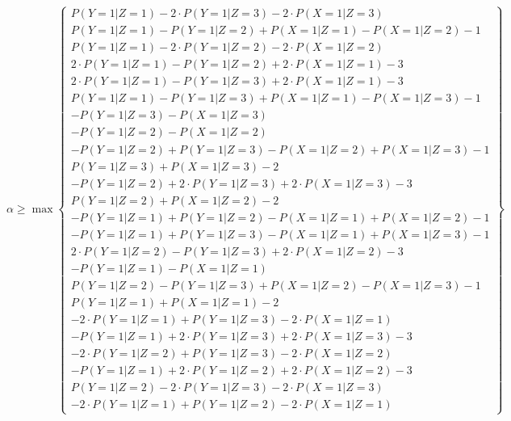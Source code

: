 \documentclass[
]{article}
\theoremstyle{plain}
\begin{document}
\[
\alpha \ge \max
\begin{Bmatrix}
P(Y = 1 | Z = 1)-2\cdot P(Y = 1 | Z = 3)-2\cdot P(X = 1 | Z = 3) \\ 
P(Y = 1 | Z = 1)-P(Y = 1 | Z = 2) +  P(X = 1 | Z = 1)-P(X = 1 | Z = 2) -1 \\ 
P(Y = 1 | Z = 1)-2\cdot P(Y = 1 | Z = 2)-2\cdot P(X = 1 | Z = 2) \\ 
2\cdot P(Y = 1 | Z = 1)-P(Y = 1 | Z = 2) +  2\cdot P(X = 1 | Z = 1) -3 \\ 
2\cdot P(Y = 1 | Z = 1)-P(Y = 1 | Z = 3) +  2\cdot P(X = 1 | Z = 1) -3 \\ 
P(Y = 1 | Z = 1)-P(Y = 1 | Z = 3) +  P(X = 1 | Z = 1)-P(X = 1 | Z = 3) -1 \\ 
-P(Y = 1 | Z = 3)-P(X = 1 | Z = 3) \\ 
-P(Y = 1 | Z = 2)-P(X = 1 | Z = 2) \\ 
-P(Y = 1 | Z = 2) +  P(Y = 1 | Z = 3)-P(X = 1 | Z = 2) +  P(X = 1 | Z = 3) -1 \\ 
 P(Y = 1 | Z = 3) +  P(X = 1 | Z = 3) -2 \\ 
-P(Y = 1 | Z = 2) +  2\cdot P(Y = 1 | Z = 3) +  2\cdot P(X = 1 | Z = 3) -3 \\ 
 P(Y = 1 | Z = 2) +  P(X = 1 | Z = 2) -2 \\ 
-P(Y = 1 | Z = 1) +  P(Y = 1 | Z = 2)-P(X = 1 | Z = 1) +  P(X = 1 | Z = 2) -1 \\ 
-P(Y = 1 | Z = 1) +  P(Y = 1 | Z = 3)-P(X = 1 | Z = 1) +  P(X = 1 | Z = 3) -1 \\ 
 2\cdot P(Y = 1 | Z = 2)-P(Y = 1 | Z = 3) +  2\cdot P(X = 1 | Z = 2) -3 \\ 
-P(Y = 1 | Z = 1)-P(X = 1 | Z = 1) \\ 
 P(Y = 1 | Z = 2)-P(Y = 1 | Z = 3) +  P(X = 1 | Z = 2)-P(X = 1 | Z = 3) -1 \\ 
P(Y = 1 | Z = 1) +  P(X = 1 | Z = 1) -2 \\ 
-2\cdot P(Y = 1 | Z = 1) +  P(Y = 1 | Z = 3)-2\cdot P(X = 1 | Z = 1) \\ 
-P(Y = 1 | Z = 1) +  2\cdot P(Y = 1 | Z = 3) +  2\cdot P(X = 1 | Z = 3) -3 \\ 
-2\cdot P(Y = 1 | Z = 2) +  P(Y = 1 | Z = 3)-2\cdot P(X = 1 | Z = 2) \\ 
-P(Y = 1 | Z = 1) +  2\cdot P(Y = 1 | Z = 2) +  2\cdot P(X = 1 | Z = 2) -3 \\ 
 P(Y = 1 | Z = 2)-2\cdot P(Y = 1 | Z = 3)-2\cdot P(X = 1 | Z = 3) \\ 
-2\cdot P(Y = 1 | Z = 1) +  P(Y = 1 | Z = 2)-2\cdot P(X = 1 | Z = 1)
\end{Bmatrix}
\]
\end{document}
